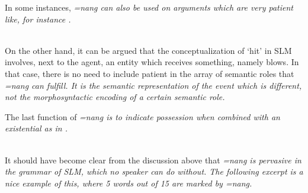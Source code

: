 In some instances, \em =nang \em can also be used on arguments which are very patient like, for instance . 

\\ 

On the other hand, it can be argued that the conceptualization of `hit' in SLM involves, next to the agent, an entity which receives something, namely blows. In that case, there is no need to include patient in the array of semantic roles that \em =nang \em can fulfill. It is the semantic representation of the event which is different, not the morphosyntactic encoding of a certain semantic role.

The last function of \em =nang \em is to indicate possession when combined with an existential as in .


 \\

It should have become clear from the discussion above that \em =nang \em is pervasive in the grammar of SLM, which no speaker can do without. The following excerpt is a nice example of this, where 5 words out of 15 are marked by \em =nang\em.

\\ 

